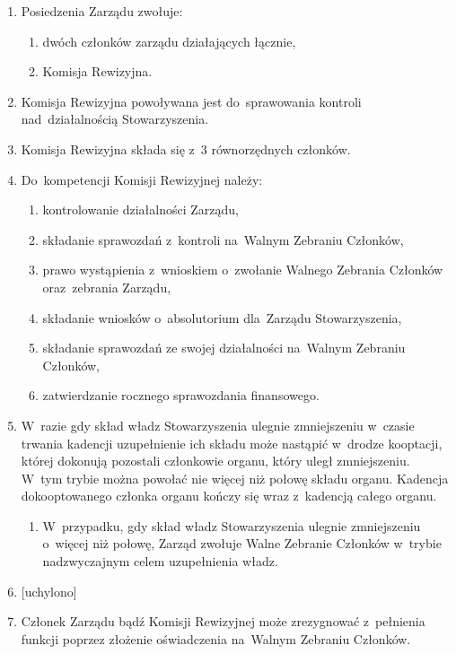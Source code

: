 \documentclass{article}
\begin{document}
\begin{enumerate}
    \item Posiedzenia Zarządu zwołuje:
      \begin{enumerate}
        \item dwóch członków zarządu działających łącznie,
        \item Komisja Rewizyjna.
      \end{enumerate}
    \item Komisja Rewizyjna powoływana jest do~sprawowania kontroli nad~działalnością Stowarzyszenia.
    \item Komisja Rewizyjna składa się z~3 równorzędnych członków.
    \item Do~kompetencji Komisji Rewizyjnej należy:
      \begin{enumerate}
        \item kontrolowanie działalności Zarządu,
        \item składanie sprawozdań z~kontroli na~Walnym Zebraniu Członków,
        \item prawo wystąpienia z~wnioskiem o~zwołanie Walnego Zebrania Członków oraz~zebrania Zarządu,
        \item składanie wniosków o~absolutorium dla~Zarządu Stowarzyszenia,
        \item składanie sprawozdań ze swojej działalności na~Walnym Zebraniu Członków,
        \item zatwierdzanie rocznego sprawozdania finansowego.
      \end{enumerate}
    \item W~razie gdy skład władz Stowarzyszenia ulegnie zmniejszeniu w~czasie trwania kadencji uzupełnienie ich składu może nastąpić w~drodze kooptacji, której dokonują pozostali członkowie organu, który uległ zmniejszeniu. W~tym trybie można powołać nie więcej niż połowę składu organu. Kadencja dokooptowanego członka organu kończy się wraz z~kadencją całego organu.
      \begin{enumerate}
        \item W~przypadku, gdy skład władz Stowarzyszenia ulegnie zmniejszeniu o~więcej niż połowę, Zarząd zwołuje Walne Zebranie Członków w~trybie nadzwyczajnym celem uzupełnienia władz.
      \end{enumerate}
    \item {[uchylono]}
    \item Członek Zarządu bądź Komisji Rewizyjnej może zrezygnować z~pełnienia funkcji poprzez złożenie oświadczenia na~Walnym Zebraniu Członków.
  \end{enumerate}
\end{document}

